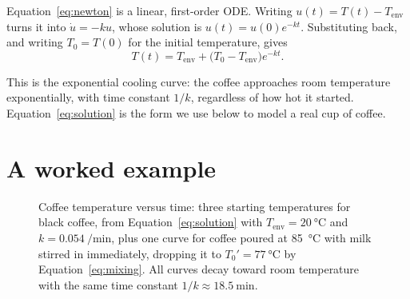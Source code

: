 \documentclass[11pt]{article}
\begin{document}
Equation~\eqref{eq:newton} is a linear, first-order ODE. Writing
$u(t) = T(t) - T_{\text{env}}$ turns it into $\dot u = -ku$, whose solution
is $u(t) = u(0) e^{-kt}$. Substituting back, and writing $T_0 = T(0)$ for
the initial temperature, gives
\begin{equation}
  \label{eq:solution}
  T(t) = T_{\text{env}} + \bigl(T_0 - T_{\text{env}}\bigr) e^{-kt}.
\end{equation}

This is the exponential cooling curve: the coffee approaches room
temperature exponentially, with time constant $1/k$, regardless of how hot
it started. Equation~\eqref{eq:solution} is the form we use below to model
a real cup of coffee.

\section{A worked example}

\begin{figure}[t]
  \centering
  \caption{Coffee temperature versus time: three starting temperatures for
    black coffee, from Equation~\eqref{eq:solution} with
    $T_{\text{env}} = \SI{20}{\celsius}$ and $k = \SI{0.054}{\per\minute}$,
    plus one curve for coffee poured at \SI{85}{\celsius} with milk
    stirred in immediately, dropping it to $T_0' = \SI{77}{\celsius}$ by
    Equation~\eqref{eq:mixing}. All curves decay toward room temperature
    with the same time constant $1/k \approx \SI{18.5}{\minute}$.}
  \label{fig:cooling}
\end{figure}
\end{document}
